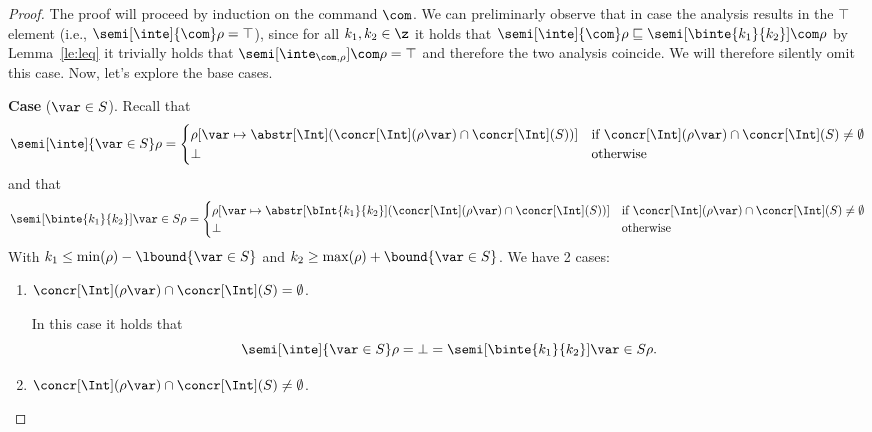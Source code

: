 \begin{proof}

  The proof will proceed by induction on the command \(\com\). We can
  preliminarly observe that in case the analysis results in the
  \(\top\) element (i.e., \({\semi[\inte]{\com}\rho = \top}\)), since
  for all \(k_1,k_2 \in \z\) it holds that
  \(\semi[\inte]{\com}\rho \sqsubseteq
  \semi[\binte{k_1}{k_2}]{\com}\rho\) by Lemma~\ref{le:leq} it
  trivially holds that \(\semi[\inte_{\com,\rho}]{\com}\rho = \top\)
  and therefore the two analysis coincide. We will therefore silently
  omit this case.  Now, let's explore the base cases.

  \medskip
  
  \noindent
  \textbf{Case} (\(\var \in S\)).
  Recall that
  \begin{equation*}
    \semi[\inte]{\var \in S}\rho = \begin{cases}
      \rho[\var \mapsto \abstr[\Int](\concr[\Int](\rho\var) \cap \concr[\Int](S))] & \text{if } \concr[\Int](\rho\var) \cap \concr[\Int](S) \neq \emptyset \\
      \bot & \text{otherwise}
    \end{cases}
  \end{equation*}
  and that
  \begin{equation*}
    \semi[\binte{k_1}{k_2}]{\var \in S}\rho = \begin{cases}

      \rho[\var \mapsto \abstr[\bInt{k_1}{k_2}](\concr[\Int](\rho\var) \cap \concr[\Int](S))] & \text{if } \concr[\Int](\rho\var) \cap \concr[\Int](S) \neq \emptyset \\
      \bot & \text{otherwise}
    \end{cases}
  \end{equation*}
  With \(k_1 \leq \min(\rho) - \lbound{\var \in S}\) and
  \(k_2 \geq \max(\rho) + \bound{\var \in S}\). We have 2 cases:
  \begin{enumerate}[label=(\arabic*)]
  \item \({\concr[\Int](\rho\var) \cap \concr[\Int](S) = \emptyset}\).

    \noindent
    In this case it holds that
    \begin{equation*}
      \semi[\inte]{\var\in S}\rho = \bot = \semi[\binte{k_1}{k_2}]{\var \in S}\rho.
    \end{equation*}
    
  \item \({\concr[\Int](\rho\var) \cap \concr[\Int](S) \neq
      \emptyset}\).


\end{enumerate}
\end{proof}
